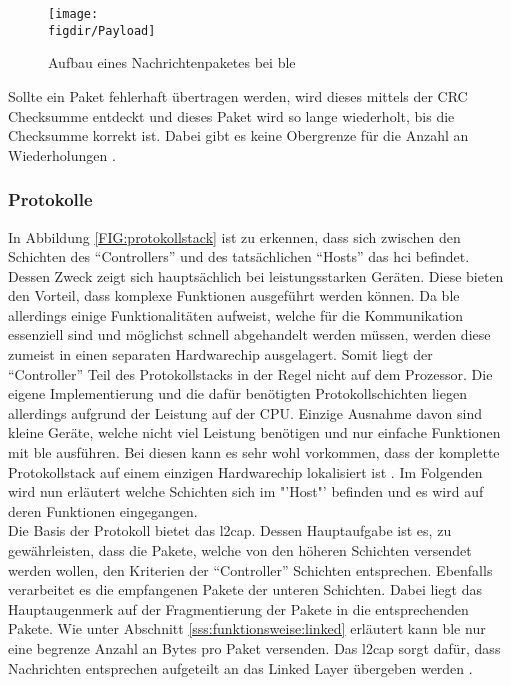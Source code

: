 \begin{figure}[h]
	\centering
	\texttt{[image: \\figdir/Payload]}
	\caption{Aufbau eines Nachrichtenpaketes bei \ac{ble}}
	\label{FIG:payload}
\end{figure}

\noindent Sollte ein Paket fehlerhaft übertragen werden, wird dieses mittels der CRC Checksumme entdeckt und dieses Paket wird so lange wiederholt, bis die Checksumme korrekt ist. Dabei gibt es keine Obergrenze für die Anzahl an Wiederholungen \cite[Seite 23]{Townsend14:GSB}.\\

\subsubsection{Protokolle}
\label{sss:funktionsweise:protocoll}

In Abbildung \ref{FIG:protokollstack} ist zu erkennen, dass sich zwischen den Schichten des "`Controllers"' und des tatsächlichen "`Hosts"' das \ac{hci} befindet. Dessen Zweck zeigt sich hauptsächlich bei leistungsstarken Geräten. Diese bieten den Vorteil, dass komplexe Funktionen ausgeführt werden können. Da \ac{ble} allerdings einige Funktionalitäten aufweist, welche für die Kommunikation essenziell sind und möglichst schnell abgehandelt werden müssen, werden diese zumeist in einen separaten Hardwarechip ausgelagert. Somit liegt der "`Controller"' Teil des Protokollstacks in der Regel nicht auf dem Prozessor. Die eigene Implementierung und die dafür benötigten Protokollschichten liegen allerdings aufgrund der Leistung auf der CPU. Einzige Ausnahme davon sind kleine Geräte, welche nicht viel Leistung benötigen und nur einfache Funktionen mit \ac{ble} ausführen. Bei diesen kann es sehr wohl vorkommen, dass der komplette Protokollstack auf einem einzigen Hardwarechip lokalisiert ist \cite[Seite 24]{Townsend14:GSB}. Im Folgenden wird nun erläutert welche Schichten sich im "'Host"' befinden und es wird auf deren Funktionen eingegangen.\\  

\noindent Die Basis der Protokoll bietet das \ac{l2cap}. Dessen Hauptaufgabe ist es, zu gewährleisten, dass die Pakete, welche von den höheren Schichten versendet werden wollen, den Kriterien der "`Controller"' Schichten entsprechen. Ebenfalls verarbeitet es die empfangenen Pakete der unteren Schichten. Dabei liegt das Hauptaugenmerk auf der Fragmentierung der Pakete in die entsprechenden Pakete. Wie unter Abschnitt \ref{sss:funktionsweise:linked} erläutert kann \ac{ble} nur eine begrenze Anzahl an Bytes pro Paket versenden. Das \ac{l2cap} sorgt dafür, dass Nachrichten entsprechen aufgeteilt an das Linked Layer übergeben werden \cite{TI:WWW}.\\

